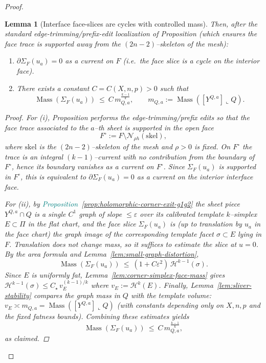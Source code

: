 \documentclass[11pt]{article}
\newcommand{\REVMZ}[1]{\textcolor{teal}{#1}}  %
\numberwithin{equation}{section}  %
\theoremstyle{plain}
\newtheorem{lemma}[theorem]{Lemma}
\theoremstyle{definition}
\theoremstyle{remark}
\DeclareMathOperator{\Mass}{Mass}
\begin{document}
\begin{proof}
\begin{lemma}[{Interface face-slices are cycles with controlled mass}]
\smallskip\noindent
Then, after the standard edge-trimming/prefix-edit localization of Proposition
(which ensures the face trace is supported away from the $(2n-2)$--skeleton of the mesh):
\begin{enumerate}
\item[\textnormal{(i)}] $\partial\Sigma_F(u_a)=0$ as a current on $F$ (i.e.\ the face slice is a cycle on the interior face).
\item[\textnormal{(ii)}] There exists a constant $C=C(X,n,p)>0$ such that
\[
\Mass(\Sigma_F(u_a))\ \le\ C\,m_{Q,a}^{\frac{k-1}{k}},
\qquad
m_{Q,a}:=\Mass([Y^{Q,a}]\llcorner Q).
\]
\end{enumerate}

\smallskip\noindent
\begin{proof}
For \textnormal{(i)}, Proposition performs the edge-trimming/prefix edits so that
the face trace associated to the $a$--th sheet is supported in the \emph{open} face
\[
F^\circ:=F\setminus \mathcal N_{\rho h}(\mathrm{skel}),
\]
where $\mathrm{skel}$ is the $(2n-2)$--skeleton of the mesh and $\rho>0$ is fixed.
On $F^\circ$ the trace is an integral $(k-1)$--current with no contribution from the boundary of $F^\circ$,
hence its boundary vanishes as a current on $F^\circ$. Since $\Sigma_F(u_a)$ is supported in $F^\circ$,
this is equivalent to $\partial\Sigma_F(u_a)=0$ as a current on the interior interface face.

For \textnormal{(ii)}, by \REVMZ{Proposition~\ref{prop:holomorphic-corner-exit-g1g2}} the sheet piece $Y^{Q,a}\cap Q$ is a single
$C^1$ graph of slope $\le \varepsilon$ over its calibrated template $k$--simplex $E\subset \Pi$ in the flat chart,
and the face slice $\Sigma_F(u_a)$ is (up to translation by $u_a$ in the face chart) the graph image of the corresponding
template facet $\sigma\subset E$ lying in $F$.
Translation does not change mass, so it suffices to estimate the slice at $u=0$.
By the area formula and Lemma~\ref{lem:small-graph-distortion},
\[
\Mass(\Sigma_F(u_a))\ \le\ (1+C\varepsilon^2)\,\mathcal H^{k-1}(\sigma).
\]
Since $E$ is uniformly fat, Lemma~\ref{lem:corner-simplex-face-mass} gives
$\mathcal H^{k-1}(\sigma)\le C_\star\,v_E^{(k-1)/k}$ where $v_E:=\mathcal H^{k}(E)$.
Finally, Lemma~\ref{lem:sliver-stability} compares the graph mass in $Q$ with the template volume:
$v_E\asymp m_{Q,a}=\Mass([Y^{Q,a}]\llcorner Q)$ (with constants depending only on $X,n,p$ and the fixed fatness bounds).
Combining these estimates yields
\[
\Mass(\Sigma_F(u_a))\ \le\ C\,m_{Q,a}^{\frac{k-1}{k}},
\]
as claimed.
\end{proof}



\end{lemma}
\end{proof}
\end{document}

